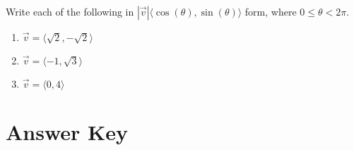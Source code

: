 Write each of the following in $|\vec{v}|\langle \cos(\theta), \sin(\theta)\rangle$ form, where $0 \leq \theta < 2\pi$.
\begin{multicols}{3}
\begin{enumerate}	\setcounter{enumi}{\value{Review}}
	\item $\vec{v} = \langle \sqrt{2}, -\sqrt{2} \rangle$
	\item $\vec{v} = \langle -1, \sqrt{3} \rangle$
	\item $\vec{v} = \langle 0, 4 \rangle$
\end{enumerate}	\setcounter{Review}{\value{enumi}}
\end{multicols}

\newpage

\section{Answer Key}

